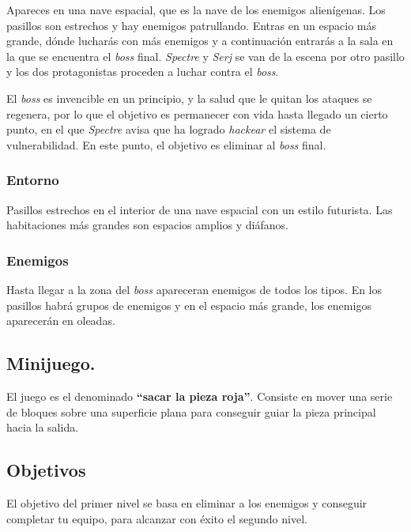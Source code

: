 \documentclass[11pt, twoside]{article}
\begin{document}
Apareces en una nave espacial, que es la nave de los enemigos alienígenas. Los pasillos son estrechos y hay enemigos patrullando. Entras en un espacio más grande, dónde lucharás con más enemigos y a continuación entrarás a la sala en la que se encuentra el \textit{boss} final. \textit{Spectre} y \textit{Serj} se van de la escena por otro pasillo y los dos protagonistas proceden a luchar contra el \textit{boss}. 

El \textit{boss} es invencible en un principio, y la salud que le quitan los ataques se regenera, por lo que el objetivo es permanecer con vida hasta llegado un cierto punto, en el que \textit{Spectre} avisa que ha logrado \textit{hackear} el sistema de vulnerabilidad. En este punto, el objetivo es eliminar al \textit{boss} final. 

\subsubsection{Entorno}

Pasillos estrechos en el interior de una nave espacial con un estilo futurista. Las habitaciones más grandes son espacios amplios y diáfanos. 

\subsubsection{Enemigos}

Hasta llegar a la zona del \textit{boss} apareceran enemigos de todos los tipos. En los pasillos habrá grupos de enemigos y en el espacio más grande, los enemigos aparecerán en oleadas.

\subsection{Minijuego.}

El juego es el denominado \textbf{``sacar la pieza roja''}. Consiste en mover una serie de bloques sobre una superficie plana para conseguir guiar la pieza principal hacia la salida.


\pagestyle{notsection}

\subsection{Objetivos}

El objetivo del primer nivel se basa en eliminar a los enemigos y conseguir completar tu equipo, para alcanzar con éxito el segundo nivel.
\end{document}
